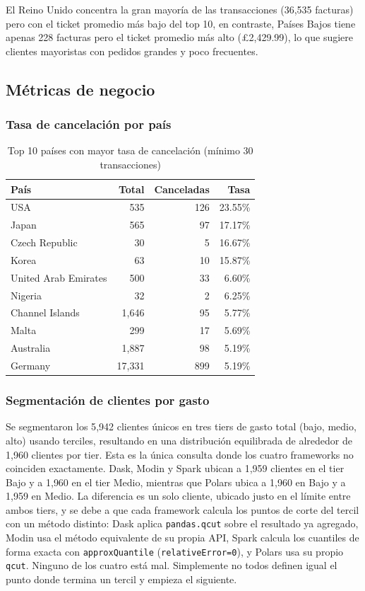 El Reino Unido concentra la gran mayoría de las transacciones (36{,}535 facturas) pero con el ticket promedio más bajo del top 10, en contraste, Países Bajos tiene apenas 228 facturas pero el ticket promedio más alto (£2{,}429.99), lo que sugiere clientes mayoristas con pedidos grandes y poco frecuentes.

\subsection{Métricas de negocio}

\subsubsection*{Tasa de cancelación por país}

\begin{table}[H]
\centering
\small
\begin{tabular}{lrrr}
\toprule
\textbf{País} & \textbf{Total} & \textbf{Canceladas} & \textbf{Tasa} \\
\midrule
USA & 535 & 126 & 23.55\% \\
Japan & 565 & 97 & 17.17\% \\
Czech Republic & 30 & 5 & 16.67\% \\
Korea & 63 & 10 & 15.87\% \\
United Arab Emirates & 500 & 33 & 6.60\% \\
Nigeria & 32 & 2 & 6.25\% \\
Channel Islands & 1{,}646 & 95 & 5.77\% \\
Malta & 299 & 17 & 5.69\% \\
Australia & 1{,}887 & 98 & 5.19\% \\
Germany & 17{,}331 & 899 & 5.19\% \\
\bottomrule
\end{tabular}
\caption{Top 10 países con mayor tasa de cancelación (mínimo 30 transacciones)}
\end{table}

\subsubsection*{Segmentación de clientes por gasto}

Se segmentaron los 5{,}942 clientes únicos en tres tiers de gasto total (bajo, medio, alto) usando terciles, resultando en una distribución equilibrada de alrededor de 1{,}960 clientes por tier. Esta es la única consulta donde los cuatro frameworks no coinciden exactamente. Dask, Modin y Spark ubican a 1{,}959 clientes en el tier Bajo y a 1{,}960 en el tier Medio, mientras que Polars ubica a 1{,}960 en Bajo y a 1{,}959 en Medio. La diferencia es un solo cliente, ubicado justo en el límite entre ambos tiers, y se debe a que cada framework calcula los puntos de corte del tercil con un método distinto: Dask aplica \texttt{pandas.qcut} sobre el resultado ya agregado, Modin usa el método equivalente de su propia API, Spark calcula los cuantiles de forma exacta con \texttt{approxQuantile} (\texttt{relativeError=0}), y Polars usa su propio \texttt{qcut}. Ninguno de los cuatro está mal. Simplemente no todos definen igual el punto donde termina un tercil y empieza el siguiente.

